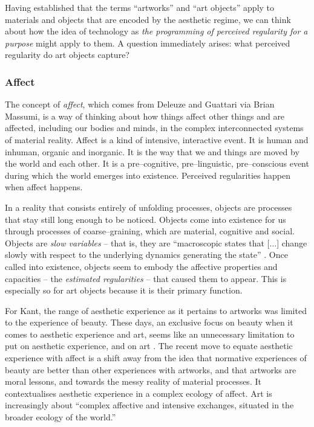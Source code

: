 \documentclass[letter:wpaper]{article}
\begin{document}
    Having established that the terms “artworks” and “art objects” apply to materials and objects that are encoded by the aesthetic regime, we can think about how the idea of technology as {\emph{the programming of perceived regularity for a purpose}} might apply to them. A question immediately arises: what perceived regularity do art objects capture?

    \subsubsection{Affect}

    The concept of \emph{affect}, which comes from Deleuze and Guattari via Brian Massumi, is a way of thinking about how things affect other things and are affected, including our bodies and minds, in the complex interconnected systems of material reality. Affect is a kind of intensive, interactive event. It is human and inhuman, organic and inorganic. It is the way that we and things are moved by the world and each other. It is a pre–cognitive, pre–linguistic, pre–conscious event during which the world emerges into existence. Perceived regularities happen when affect happens.
    
    In a reality that consists entirely of unfolding processes, objects are processes that stay still long enough to be noticed. Objects come into existence for us through processes of coarse–graining, which are material, cognitive and social. Objects are \emph{slow variables} – that is, they are “macroscopic states that [...] change slowly with respect to the underlying dynamics generating the state” \citep[p.61]{FlackEtAlTmsclsSymmtryUncrtnty2013}. Once called into existence, objects seem to embody the affective properties and capacities – the \emph{estimated regularities} \citep[p.9]{FlackCrsGrnng2017} – that caused them to appear. This is especially so for art objects because it is their primary function.

    For Kant, the range of aesthetic experience as it pertains to artworks was limited to the experience of beauty. These days, an exclusive focus on beauty when it comes to aesthetic experience and art, seems like an unnecessary limitation to put on aesthetic experience, and on art \citep[pp.121–122]{HighmoreBttrAftrTst2010}. The recent move to equate aesthetic experience with affect is a shift away from the idea that normative experiences of beauty are better than other experiences with artworks, and that artworks are moral lessons, and towards the messy reality of material processes. It contextualises aesthetic experience in a complex ecology of affect. Art is increasingly about “complex affective and intensive exchanges, situated in the broader ecology of the world.” \citep[p.155]{HighmoreBttrAftrTst2010}
\end{document}
